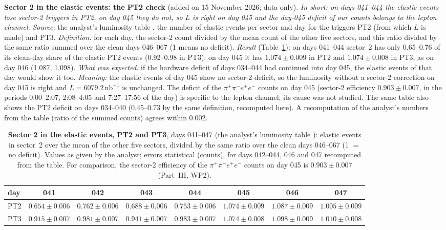 \documentclass[11pt,a4paper]{article}
\newcommand{\ppee}{\ensuremath{\pi^{+}\pi^{-}e^{+}e^{-}}\xspace}
\newcommand{\nbinv}{\ensuremath{\mathrm{nb}^{-1}}\xspace}
\newcommand{\code}[1]{\texttt{\detokenize{#1}}}
\begin{document}
\textbf{Sector 2 in the elastic events: the PT2 check} (added on 15 November 2026; data only). \emph{In short: on days 041--044 the elastic
events lose sector-2 triggers in PT2, on day 045 they do not, so $L$ is right on day 045 and the day-045 deficit of our counts belongs to the
lepton channel.} \emph{Source:} the analyst's luminosity table \code{s2_trigger_perday.csv}, the number of elastic events per sector and day
for the triggers PT2 (from which $L$ is made) and PT3. \emph{Definition:} for each day, the sector-2 count divided by the mean count of the
other five sectors, and this ratio divided by the same ratio summed over the clean days 046--067 (1 means no deficit). \emph{Result}
(Table~\ref{tab:s2pt2}): on days 041--044 sector~2 has only 0.65--0.76 of its clean-day share of the elastic PT2 events (0.92--0.98 in PT3);
on day 045 it has $1.074\pm0.009$ in PT2 and $1.074\pm0.008$ in PT3, as on day 046 (1.087, 1.098). \emph{What was expected:} if the
hardware deficit of days 034--044 had continued into day 045, the elastic events of that day would show it too. \emph{Meaning:} the elastic
events of day 045 show no sector-2 deficit, so the luminosity without a sector-2 correction on day 045 is right and $L=6079.2\,\nbinv$ is
unchanged. The deficit of the \ppee counts on day 045 (sector-2 efficiency $0.903\pm0.007$, in the periods 0:00--2:07, 2:08--4:05 and
7:27--17:56 of the day) is specific to the lepton channel; its cause was not studied. The same table also shows the PT2 deficit on days
034--040 (0.45--0.73 by the same definition, recomputed here). A recomputation of the analyst's numbers from the table (ratio of the summed
counts) agrees within 0.002.

\begin{table}[H]
\centering
\caption{\textbf{Sector 2 in the elastic events, PT2 and PT3}, days 041--047 (the analyst's luminosity table \code{s2_trigger_perday.csv}):
elastic events in sector~2 over the mean of the other five sectors, divided by the same ratio over the clean days 046--067 (1 $=$ no
deficit). Values as given by the analyst; errors statistical (counts), for days 042--044, 046 and 047 recomputed from the table. For comparison, the
sector-2 efficiency of the \ppee counts on day 045 is $0.903\pm0.007$ (Part~III, WP2).}
\label{tab:s2pt2}
\footnotesize
\setlength{\tabcolsep}{4pt}
\begin{tabular}{@{}lccccccc@{}}
\toprule
day & 041 & 042 & 043 & 044 & 045 & 046 & 047 \\
\midrule
PT2 & $0.654\pm0.006$ & $0.762\pm0.006$ & $0.688\pm0.006$ & $0.753\pm0.006$ & $\mathbf{1.074\pm0.009}$ & $1.087\pm0.009$ & $1.005\pm0.009$ \\
PT3 & $0.915\pm0.007$ & $0.981\pm0.007$ & $0.941\pm0.007$ & $0.983\pm0.007$ & $\mathbf{1.074\pm0.008}$ & $1.098\pm0.009$ & $1.010\pm0.008$ \\
\bottomrule
\end{tabular}
\end{table}
\end{document}
